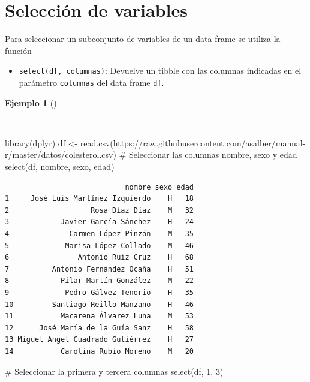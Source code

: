 \documentclass[
  spanish,
  a4paper,
]{scrreport}
\newenvironment{Shaded}{\begin{snugshade}}{\end{snugshade}}
\newcommand{\CommentTok}[1]{\textcolor[rgb]{0.37,0.37,0.37}{#1}}
\newcommand{\DecValTok}[1]{\textcolor[rgb]{0.68,0.00,0.00}{#1}}
\newcommand{\FunctionTok}[1]{\textcolor[rgb]{0.28,0.35,0.67}{#1}}
\newcommand{\NormalTok}[1]{\textcolor[rgb]{0.00,0.23,0.31}{#1}}
\newcommand{\OtherTok}[1]{\textcolor[rgb]{0.00,0.23,0.31}{#1}}
\newcommand{\StringTok}[1]{\textcolor[rgb]{0.13,0.47,0.30}{#1}}
\providecommand{\tightlist}{%
  \setlength{\itemsep}{0pt}\setlength{\parskip}{0pt}}
\theoremstyle{definition}
\theoremstyle{definition}
\newtheorem{example}{Ejemplo}[chapter]
\theoremstyle{remark}
\begin{document}
\section{Selección de variables}\label{selecciuxf3n-de-variables}

Para seleccionar un subconjunto de variables de un data frame se utiliza
la función

\begin{itemize}
\tightlist
\item
  \texttt{select(df,\ columnas)}: Devuelve un tibble con las columnas
  indicadas en el parámetro \texttt{columnas} del data frame
  \texttt{df}.
\end{itemize}

\begin{example}[]\protect\hypertarget{exm-select}{}\label{exm-select}

~

\begin{Shaded}
\begin{Highlighting}[]
\FunctionTok{library}\NormalTok{(dplyr)}
\NormalTok{df }\OtherTok{\textless{}{-}} \FunctionTok{read.csv}\NormalTok{(}\StringTok{\textquotesingle{}https://raw.githubusercontent.com/asalber/manual{-}r/master/datos/colesterol.csv\textquotesingle{}}\NormalTok{)}
\CommentTok{\# Seleccionar las columnas nombre, sexo y edad}
\FunctionTok{select}\NormalTok{(df, nombre, sexo, edad)}
\end{Highlighting}
\end{Shaded}

\begin{verbatim}
                            nombre sexo edad
1     José Luis Martínez Izquierdo    H   18
2                   Rosa Díaz Díaz    M   32
3            Javier García Sánchez    H   24
4              Carmen López Pinzón    M   35
5             Marisa López Collado    M   46
6                Antonio Ruiz Cruz    H   68
7          Antonio Fernández Ocaña    H   51
8            Pilar Martín González    M   22
9             Pedro Gálvez Tenorio    H   35
10         Santiago Reillo Manzano    H   46
11           Macarena Álvarez Luna    M   53
12      José María de la Guía Sanz    H   58
13 Miguel Angel Cuadrado Gutiérrez    H   27
14           Carolina Rubio Moreno    M   20
\end{verbatim}

\begin{Shaded}
\begin{Highlighting}[]
\CommentTok{\# Seleccionar la primera y tercera columnas}
\FunctionTok{select}\NormalTok{(df, }\DecValTok{1}\NormalTok{, }\DecValTok{3}\NormalTok{)}
\end{Highlighting}
\end{Shaded}


\end{example}
\end{document}

